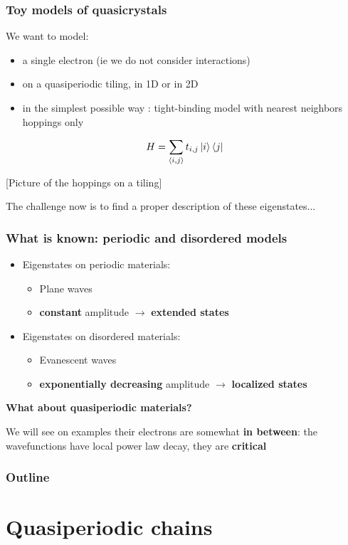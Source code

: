 \documentclass[xcolor=x11names,compress,professionalfonts]{beamer}
\renewcommand{\(}{\begin{columns}}
\renewcommand{\)}{\end{columns}}
\newcommand{\<}[1]{\begin{column}{#1}}
\renewcommand{\>}{\end{column}}
\begin{document}
\begin{frame}
\frametitle{Toy models of quasicrystals}
We want to model:
\begin{itemize}
	\item a single electron (ie we do not consider interactions)
	\item on a quasiperiodic tiling, in 1D or in 2D
	\item in the simplest possible way : tight-binding model with nearest neighbors hoppings only
\end{itemize}
\[
	H = \sum_{\langle i,j \rangle} t_{i,j} \ket{i} \bra{j}
\]

[Picture of the hoppings on a tiling]

The challenge now is to find a proper description of these eigenstates... 
\end{frame}

\begin{frame}
\frametitle{What is known: periodic and disordered models}
\begin{itemize}
	\item Eigenstates on periodic materials: 
	\begin{itemize}
		\item Plane waves 
		\item \textbf{constant} amplitude $\rightarrow$ \textbf{extended states}
	\end{itemize}
	
	\item Eigenstates on disordered materials: 
	\begin{itemize}
		\item Evanescent waves
		\item  \textbf{exponentially decreasing} amplitude $\rightarrow$ \textbf{localized states}
	\end{itemize}
	
\end{itemize}
\textbf{What about quasiperiodic materials?}

\textcolor{Complementary}{We will see on examples their electrons are somewhat \textbf{in between}: the wavefunctions have local power law decay, they are \textbf{critical}}
\end{frame}

\begin{frame}
\frametitle{Outline}
\tableofcontents[hideallsubsections]
\end{frame}

\section{Quasiperiodic chains}
\end{document}
